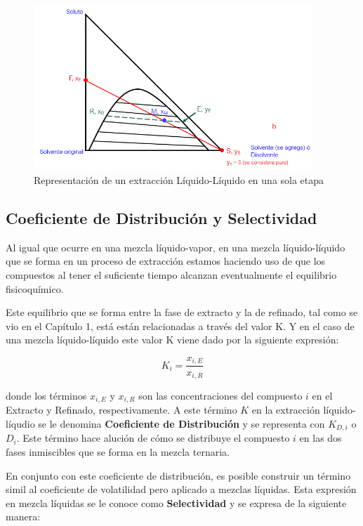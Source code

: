 \documentclass[11pt]{book}
\begin{document}
\begin{figure}[H]
    \centering
    \includegraphics[width =10.5cm]{img/LiquidoLiquido/ExtracionLiqLiq_1Etapa_2.PNG}
    \caption{Representación de un extracción Líquido-Líquido en una sola etapa}
    \label{fig:ExtraccionLiqLiq_1Etapa_2}
\end{figure}

\subsection{Coeficiente de Distribución y Selectividad}

Al igual que ocurre en una mezcla líquido-vapor, en una mezcla líquido-líquido que se forma en un proceso de extracción estamos haciendo uso de que los compuestos al tener el suficiente tiempo alcanzan eventualmente el equilibrio fisicoquímico. 

Este equilibrio que se forma entre la fase de extracto y la de refinado, tal como se vio en el Capítulo 1, está están relacionadas a través del valor K. Y en el caso de una mezcla líquido-líquido este valor K viene dado por la siguiente expresión:

\begin{equation}
    \label{eq:Extraccion_LiqLiq_3}
    K_{i} = \frac{x_{i,E}}{x_{i,R}}
\end{equation}

donde los términos $x_{i,E}$ y $x_{i,R}$ son las concentraciones del compuesto $i$ en el Extracto y Refinado, respectivamente. A este término $K$ en la extracción líquido-líqudio se le denomina \textbf{Coeficiente de Distribución} y se representa con $K_{D,i}$ o $D_i$. Este término hace alución de cómo se distribuye el compuesto $i$ en las dos fases inmiscibles que se forma en la mezcla ternaria.


En conjunto con este coeficiente de distribución, es posible construir un término simil al coeficiente de volatilidad pero aplicado a mezclas líquidas. Esta expresión en mezcla líquidas se le conoce como \textbf{Selectividad} y se expresa de la siguiente manera:
\end{document}
